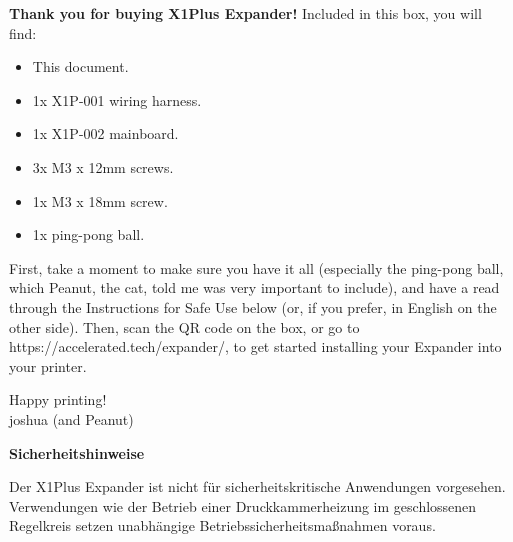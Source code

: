 \documentclass{article}
\begin{document}
\fontsize{10}{10}\selectfont

\textbf{Thank you for buying X1Plus Expander!}  Included in this box, you will find:

\fontsize{9}{9}\selectfont
\begin{multicols}{2}
\begin{itemize}
\item{This document.}
\vspace{-3pt}
\item{1x X1P-001 wiring harness.}
\vspace{-3pt}
\item{1x X1P-002 mainboard.}
\vspace{-3pt}
\item{3x M3 x 12mm screws.}
\vspace{-3pt}
\item{1x M3 x 18mm screw.}
\vspace{-3pt}
\item{1x ping-pong ball.}
\vspace{-3pt}
\end{itemize}
\end{multicols}
\fontsize{10}{10}\selectfont

\vspace{-8pt}

First, take a moment to make sure you have it all (especially the ping-pong
ball, which Peanut, the cat, told me was very important to include), and
have a read through the Instructions for Safe Use below (or, if you prefer,
in English on the other side).  Then, scan the QR
code on the box, or go to https://accelerated.tech/expander/, to get started
installing your Expander into your printer.

\hspace*{3in}Happy printing! \\
\hspace*{3in}joshua (and Peanut)

\begin{center}
\fontsize{14}{14}\selectfont
\textbf{Sicherheitshinweise}
\end{center}

\fontsize{7}{7}\selectfont

Der X1Plus Expander ist nicht für sicherheitskritische Anwendungen vorgesehen. Verwendungen wie der Betrieb einer Druckkammerheizung im geschlossenen Regelkreis setzen unabhängige Betriebssicherheitsmaßnahmen voraus. 
\end{document}
